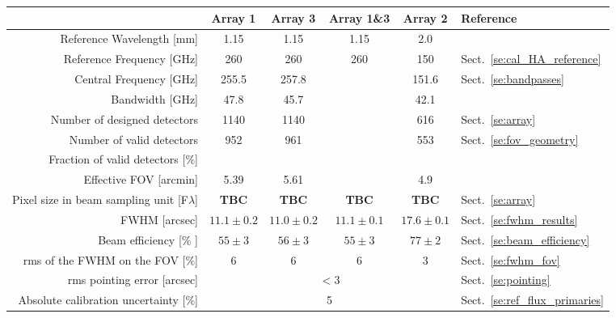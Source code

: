 \begin{table}[h]
\begin{center}    
  \begin{threeparttable}
    \begin{tabular}{|r|c|c|c|c|l|}
      \hline
      & Array 1 & Array 3  & Array 1\&3 & Array 2 & Reference \\
      \hline
      \hline
      Reference Wavelength  [mm]  &  1.15   &  1.15  & 1.15 & 2.0   &   \\
      Reference Frequency  [GHz]  &  260    &  260   & 260  & 150   &  Sect.~\ref{se:cal_HA_reference}  \\
      Central Frequency [GHz]     &  255.5  &  257.8 &      & 151.6 &  Sect.~\ref{se:bandpasses}  \\
      Bandwidth         [GHz]     &  47.8   &  45.7  &      & 42.1  &   \\
      \hline
      Number of designed detectors                   & 1140      &  1140    &    &    616  & Sect.~\ref{se:array}\\
      Number of valid detectors                      &  952      &   961    &    &    553  & Sect.~\ref{se:fov_geometry}\\
      Fraction of valid detectors [$\%$]             &           &          &    &         & \\
      Effective FOV\tnote{a}\hspace{1mm} [arcmin]    &  5.39     &   5.61   &    &    4.9  & \\
      \hline
      Pixel size in beam sampling unit [F$\lambda$]  & {\bf TBC} & {\bf TBC} &  {\bf TBC}  &  {\bf TBC} & Sect.~\ref{se:array}\\
      \hline
      FWHM\tnote{b}\hspace{1mm} [arcsec]    &  $11.1 \pm 0.2$   &  $11.0 \pm 0.2$  &   $11.1 \pm 0.1$  &  $17.6 \pm 0.1$  &  Sect.~\ref{se:fwhm_results}\\
      Beam efficiency\tnote{c}\hspace{1mm} [\% ] &  $55 \pm 3$  &  $56 \pm 3$   &  $55 \pm 3$   &  $77 \pm 2$  &  Sect.~\ref{se:beam_efficiency}\\
      rms of the FWHM on the FOV [$\%$]          &    6         &      6        &       6        &      3        & Sect.~\ref{se:fwhm_fov}\\
      \hline
      rms pointing error    [arcsec]             & \multicolumn{4}{|c|}{$<3$} &  Sect.~\ref{se:pointing} \\
      \hline
      Absolute calibration uncertainty [\%]      &  \multicolumn{4}{|c|}{5}   & Sect.~\ref{se:ref_flux_primaries} \\

\end{tabular}
\end{threeparttable}
\end{center}
\end{table}
